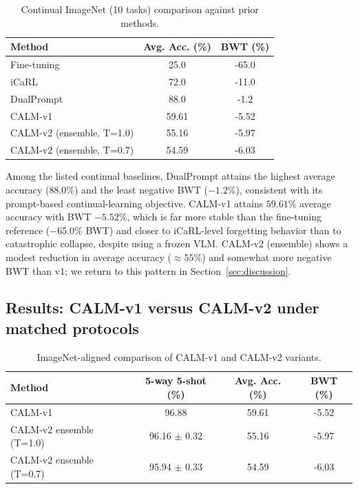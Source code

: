 \documentclass{article}
\begin{document}
\begin{table}[t]
\caption{Continual ImageNet (10 tasks) comparison against prior methods.}
\label{tab:continual_baselines}
\centering
\begin{tabular}{lcc}
\toprule
Method & Avg. Acc. (\%) & BWT (\%) \\
\midrule
Fine-tuning & 25.0 & -65.0 \\
iCaRL & 72.0 & -11.0 \\
DualPrompt & 88.0 & -1.2 \\
\midrule
CALM-v1 & 59.61 & -5.52 \\
CALM-v2 (ensemble, T=1.0) & 55.16 & -5.97 \\
CALM-v2 (ensemble, T=0.7) & 54.59 & -6.03 \\
\bottomrule
\end{tabular}
\end{table}

Among the listed continual baselines, DualPrompt attains the highest average accuracy ($88.0\%$) and the least negative BWT ($-1.2\%$), consistent with its prompt-based continual-learning objective. CALM-v1 attains $59.61\%$ average accuracy with BWT $-5.52\%$, which is far more stable than the fine-tuning reference ($-65.0\%$ BWT) and closer to iCaRL-level forgetting behavior than to catastrophic collapse, despite using a frozen VLM. CALM-v2 (ensemble) shows a modest reduction in average accuracy ($\approx\!55\%$) and somewhat more negative BWT than v1; we return to this pattern in Section~\ref{sec:discussion}.

\subsection{Results: CALM-v1 versus CALM-v2 under matched protocols}\label{sec:results-v1v2}
\begin{table}[t]
\caption{ImageNet-aligned comparison of CALM-v1 and CALM-v2 variants.}
\label{tab:main}
\centering
\begin{tabular}{lccc}
\toprule
Method & 5-way 5-shot (\%) & Avg. Acc. (\%) & BWT (\%) \\
\midrule
CALM-v1 & 96.88 & 59.61 & -5.52 \\
CALM-v2 ensemble (T=1.0) & 96.16 $\pm$ 0.32 & 55.16 & -5.97 \\
CALM-v2 ensemble (T=0.7) & 95.94 $\pm$ 0.33 & 54.59 & -6.03 \\
\bottomrule
\end{tabular}
\end{table}
\end{document}
